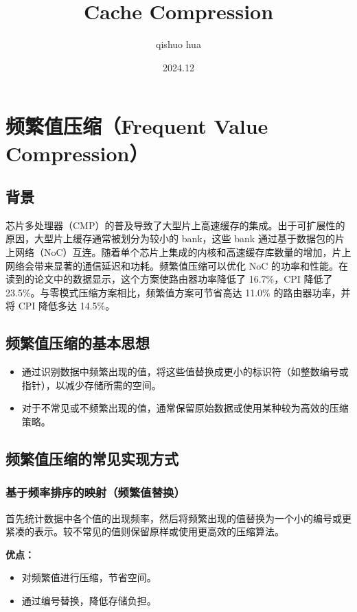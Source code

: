 \documentclass[12pt]{article}
\title{Cache Compression}
\author{qishuo hua}
\date{2024.12}
\begin{document}
\maketitle
\tableofcontents
\newpage

\section{频繁值压缩（Frequent Value Compression）}

\subsection{背景}
芯片多处理器（CMP）的普及导致了大型片上高速缓存的集成。出于可扩展性的原因，大型片上缓存通常被划分为较小的 bank，这些 bank 通过基于数据包的片上网络（NoC）互连。随着单个芯片上集成的内核和高速缓存库数量的增加，片上网络会带来显著的通信延迟和功耗。频繁值压缩可以优化 NoC 的功率和性能。在读到的论文中的数据显示，这个方案使路由器功率降低了 16.7\%，CPI 降低了 23.5\%。与零模式压缩方案相比，频繁值方案可节省高达 11.0\% 的路由器功率，并将 CPI 降低多达 14.5\%。

\subsection{频繁值压缩的基本思想}

\begin{itemize}
  \item 通过识别数据中频繁出现的值，将这些值替换成更小的标识符（如整数编号或指针），以减少存储所需的空间。
  \item 对于不常见或不频繁出现的值，通常保留原始数据或使用某种较为高效的压缩策略。
\end{itemize}

\subsection{频繁值压缩的常见实现方式}

\subsubsection{基于频率排序的映射（频繁值替换）}
首先统计数据中各个值的出现频率，然后将频繁出现的值替换为一个小的编号或更紧凑的表示。较不常见的值则保留原样或使用更高效的压缩算法。

\textbf{优点：}
\begin{itemize}
  \item 对频繁值进行压缩，节省空间。
  \item 通过编号替换，降低存储负担。
\end{itemize}
\end{document}
